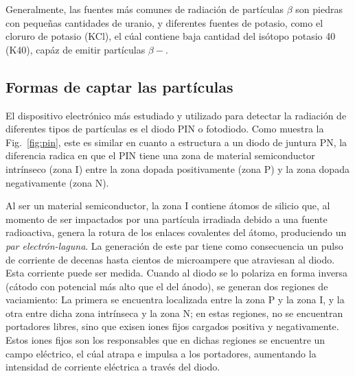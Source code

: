 \documentclass[a4paper,conference]{IEEEtran}
\begin{document}
        Generalmente, las fuentes más comunes de radiación de partículas $\beta$
        son piedras con pequeñas cantidades de uranio, y diferentes fuentes de
        potasio, como el cloruro de potasio (KCl), el cúal contiene baja
        cantidad del isótopo potasio 40 (K40), capáz de emitir partículas
        $\beta-$.

    \subsection{Formas de captar las partículas}
       El dispositivo electrónico más estudiado y utilizado para detectar la
       radiación de diferentes tipos de partículas es el diodo PIN o fotodiodo.
       Como muestra la Fig.~\ref{fig:pin}, este es similar en cuanto a
       estructura a un diodo de juntura PN, la diferencia radica en que el PIN
       tiene una zona de material semiconductor intrínseco (zona I) entre la
       zona dopada positivamente (zona P) y la zona dopada negativamente (zona
       N).\par Al ser un material semiconductor, la zona I contiene átomos de
       silicio que, al momento de ser impactados por una partícula irradiada
       debido a una fuente radioactiva, genera la rotura de los enlaces
       covalentes del átomo, produciendo un \emph{par electrón-laguna}. La
       generación de este par tiene como consecuencia un pulso de corriente de
       decenas hasta cientos de microampere que atraviesan al diodo. Esta
       corriente puede ser medida. Cuando al diodo se lo polariza en
       forma inversa (cátodo con potencial más alto que el del ánodo),
       se generan dos regiones de vaciamiento: La primera se encuentra
       localizada entre la zona P y la zona I, y la otra entre dicha zona
       intrínseca y la zona N; en estas regiones, no se encuentran portadores
       libres, sino que exisen iones fijos cargados positiva y negativamente.
       Estos iones fijos son los responsables que en dichas regiones se encuentre
       un campo eléctrico, el cúal atrapa e impulsa a los portadores, aumentando
       la intensidad de corriente eléctrica a través del diodo.
\end{document}
